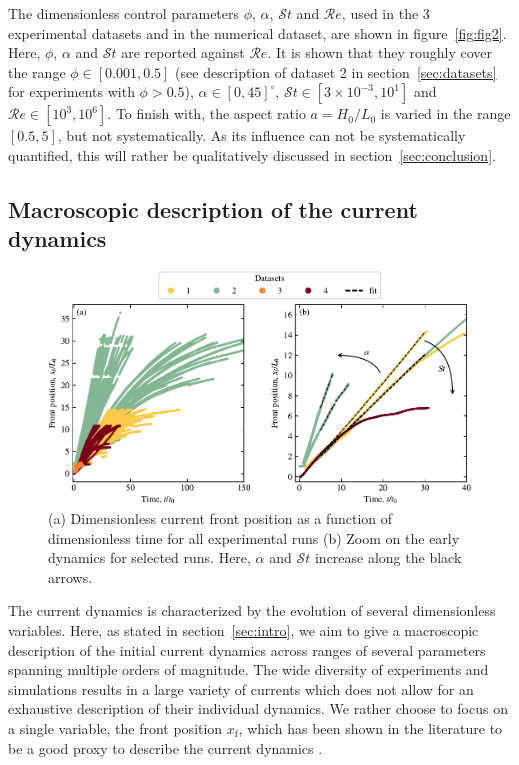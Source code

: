 \documentclass[12pt]{article}
\begin{document}
The dimensionless control parameters $\phi$, $\alpha$, $\mathcal{S}t$ and $\mathcal{R}e$, used in the 3 experimental datasets and in the numerical dataset, are shown in figure~\ref{fig:fig2}. Here, $\phi$, $\alpha$ and $\mathcal{S}t$ are reported against $\mathcal{R}e$. It is shown that they roughly cover the range $\phi \in [0.001, 0.5]$ (see description of dataset 2 in section~\ref{sec:datasets} for experiments with $\phi > 0.5$), $\alpha \in [0,45]^\circ$, $\mathcal{S}t \in [3{\times}10^{-3}, 10^{1}]$ and $\mathcal{R}e \in [10^3, 10^6]$. To finish with, the aspect ratio $a=H_0/L_0$ is varied in the range $[0.5, 5]$, but not systematically. As its influence can not be systematically quantified, this will rather be qualitatively discussed in section~\ref{sec:conclusion}.

\subsection{Macroscopic description of the current dynamics}

\begin{figure}[ht]
	\centering
	\includegraphics{figure3.pdf}
	\caption{(a) Dimensionless current front position as a function of dimensionless time for all experimental runs (b) Zoom on the early dynamics for selected runs. Here, $\alpha$ and $\mathcal{S}t$ increase along the black arrows.}
	\label{fig:fig3}
\end{figure}

The current dynamics is characterized by the evolution of several dimensionless variables. Here, as stated in section~\ref{sec:intro}, we aim to give a macroscopic description of the initial current dynamics across ranges of several parameters spanning multiple orders of magnitude. The wide diversity of experiments and simulations results in a large variety of currents which does not allow for an exhaustive description of their individual dynamics. We rather choose to focus on a single variable, the front position $x_{\text{f}}$, which has been shown in the literature to be a good proxy to describe the current dynamics \citep[e.g.][]{bonnecaze1993particle, Chowdhury2011, Adduce2012}.
\end{document}
